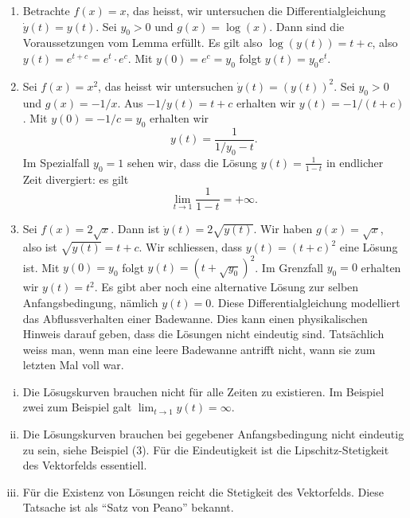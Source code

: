 \documentclass[../main.tex]{subfiles}
\begin{document}
\begin{examples}
  \leavevmode
  \begin{enumerate}[(1)]
    \item Betrachte $f(x) = x$, das heisst, wir untersuchen
      die Differentialgleichung $\dot y(t) = y(t)$.
      Sei $y_0 > 0$ und $g(x) = \log(x)$.
      Dann sind die Voraussetzungen vom Lemma erfüllt.
      Es gilt also $\log(y(t)) = t + c$, also
      $y(t) = e^{t + c} = e^t \cdot e^c$.
      Mit $y(0) = e^c = y_0$ folgt $y(t) = y_0 e^t$.
    \item Sei $f(x) = x^2$, das heisst
      wir untersuchen $\dot y(t) = {(y(t))}^2$.
      Sei $y_0 > 0$ und
      $g(x) = -1/x$.
      Aus $-1/y(t) = t + c$ erhalten wir
      $y(t) = -1/(t + c)$.
      Mit  $y(0) = -1/c = y_0$ erhalten wir
      \[
        y(t) = \frac{1}{1/y_0 - t}.
      \]
      Im Spezialfall $y_0 = 1$ sehen wir,
      dass die Lösung $y(t) = \frac{1}{1-t}$ 
      in endlicher Zeit divergiert: es gilt
      \[
        \lim_{t \to 1} \frac{1}{1-t} = +\infty.
      \]
    \item Sei $f(x) = 2\sqrt x$. Dann ist
      $\dot y (t) = 2 \sqrt{y(t)}$.
      Wir haben $g(x) = \sqrt x$,
      also ist $\sqrt{y(t)} = t + c$.
      Wir schliessen, dass
      $y(t) = {(t + c)}^2$ eine Lösung
      ist.
      Mit $y(0) = y_0$ folgt
      $y(t) = {(t + \sqrt {y_0})}^2$.
      Im Grenzfall  $y_0 = 0$ 
      erhalten wir $y(t) = t^2$.
      Es gibt aber noch eine alternative
      Lösung zur selben Anfangsbedingung,
      nämlich $y(t) = 0$.
      Diese Differentialgleichung modelliert das
      Abflussverhalten einer Badewanne.
      Dies kann einen physikalischen Hinweis darauf geben, dass
      die Lösungen nicht eindeutig sind. Tatsächlich
      weiss man, wenn man eine leere Badewanne antrifft
      nicht, wann sie zum letzten Mal voll war.
  \end{enumerate}
\end{examples}

\begin{remarks}
   \leavevmode
   \begin{enumerate}[(i)]
   \item Die Lösugskurven brauchen nicht für alle Zeiten zu existieren.
     Im Beispiel zwei zum Beispiel galt $\lim_{t \to 1} y(t) = \infty$.
   \item Die Lösungskurven brauchen bei gegebener Anfangsbedingung nicht
     eindeutig zu sein, siehe Beispiel (3). Für die
     Eindeutigkeit ist die Lipschitz-Stetigkeit des
     Vektorfelds essentiell.
   \item Für die Existenz von Lösungen reicht
     die Stetigkeit des Vektorfelds. Diese Tatsache
     ist als ``Satz von Peano'' bekannt.
 \end{enumerate}
\end{remarks}
\end{document}
